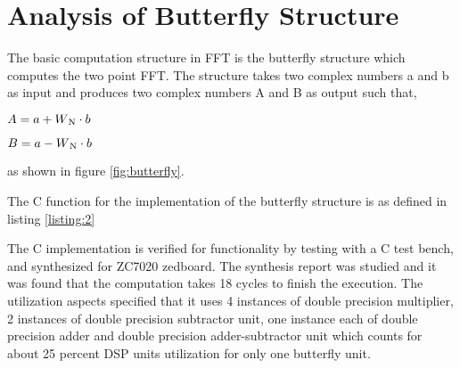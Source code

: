 \section {Analysis of Butterfly Structure}
The basic computation structure in FFT is the butterfly structure which computes the two point FFT. The structure takes  two complex numbers a and b as input and produces two complex numbers A and B as output such that,

\hspace{3cm} $A=a+W\textsubscript{N}\cdot b$

\hspace{3cm} $B=a-W\textsubscript{N}\cdot b$

\noindent as shown in figure \ref{fig:butterfly}.

\noindent The C function for the implementation of the butterfly structure is as defined in listing \ref{listing:2}


The C implementation is verified for functionality by testing with a C test bench, and synthesized for ZC7020 zedboard. The synthesis report was studied and it was found that the computation takes 18 cycles to finish the execution. The utilization aspects specified that it uses 4 instances of double precision multiplier, 2 instances of double precision subtractor unit, one instance each of double precision adder and double precision adder-subtractor unit which counts for about 25 percent DSP units utilization for only one butterfly unit. 
